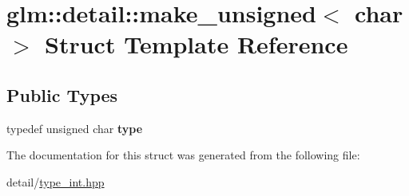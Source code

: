 \hypertarget{structglm_1_1detail_1_1make__unsigned_3_01char_01_4}{\section{glm\-:\-:detail\-:\-:make\-\_\-unsigned$<$ char $>$ Struct Template Reference}
\label{structglm_1_1detail_1_1make__unsigned_3_01char_01_4}
}
\subsection*{Public Types}
\begin{DoxyCompactItemize}
\item 
\hypertarget{structglm_1_1detail_1_1make__unsigned_3_01char_01_4_a473f89289be25f14bdc7c459e4be4fed}{typedef unsigned char {\bfseries type}}\label{structglm_1_1detail_1_1make__unsigned_3_01char_01_4_a473f89289be25f14bdc7c459e4be4fed}

\end{DoxyCompactItemize}


The documentation for this struct was generated from the following file\-:\begin{DoxyCompactItemize}
\item 
detail/\hyperlink{type__int_8hpp}{type\-\_\-int.\-hpp}\end{DoxyCompactItemize}
